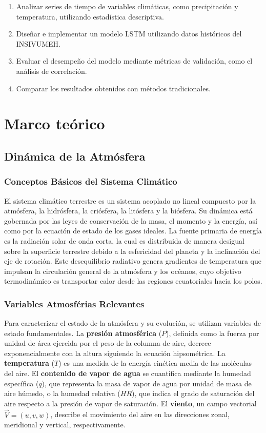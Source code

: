 \documentclass[titlepage,11pt]{report}
\begin{document}
\begin{enumerate}
    \item Analizar series de tiempo de variables climáticas, como precipitación y temperatura, utilizando estadística descriptiva. 
    \item Diseñar e implementar un modelo LSTM utilizando datos históricos del INSIVUMEH.
    \item Evaluar el desempeño del modelo mediante métricas de validación, como el análisis de correlación.
    \item Comparar los resultados obtenidos con métodos tradicionales.
\end{enumerate}

\chapter{Marco teórico}
\label{sec:marco}


\section{Dinámica de la Atmósfera}

\subsection{Conceptos Básicos del Sistema Climático}
El sistema climático terrestre es un sistema acoplado no lineal compuesto por la atmósfera, la hidrósfera, la criósfera, la litósfera y la biósfera. Su dinámica está gobernada por las leyes de conservación de la masa, el momento y la energía, así como por la ecuación de estado de los gases ideales. La fuente primaria de energía es la radiación solar de onda corta, la cual es distribuida de manera desigual sobre la superficie terrestre debido a la esfericidad del planeta y la inclinación del eje de rotación. Este desequilibrio radiativo genera gradientes de temperatura que impulsan la circulación general de la atmósfera y los océanos, cuyo objetivo termodinámico es transportar calor desde las regiones ecuatoriales hacia los polos.

\subsection{Variables Atmosférias Relevantes}
Para caracterizar el estado de la atmósfera y su evolución, se utilizan variables de estado fundamentales. La \textbf{presión atmosférica} (\(P\)), definida como la fuerza por unidad de área ejercida por el peso de la columna de aire, decrece exponencialmente con la altura siguiendo la ecuación hipsométrica. La \textbf{temperatura} (\(T\)) es una medida de la energía cinética media de las moléculas del aire. El \textbf{contenido de vapor de agua} se cuantifica mediante la humedad específica (\(q\)), que representa la masa de vapor de agua por unidad de masa de aire húmedo, o la humedad relativa (\(HR\)), que indica el grado de saturación del aire respecto a la presión de vapor de saturación. El \textbf{viento}, un campo vectorial \(\vec{V} = (u, v, w)\), describe el movimiento del aire en las direcciones zonal, meridional y vertical, respectivamente.
\end{document}
